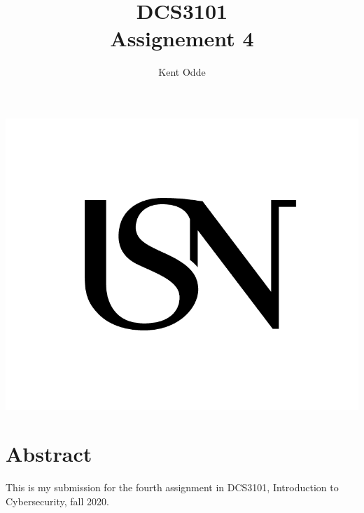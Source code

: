 \documentclass{article}
\begin{document}
\author{Kent Odde}
\title{DCS3101\\Assignement 4}

\maketitle
\thispagestyle{empty}
\begin{center}
\includegraphics[width=\linewidth,height=0.2\textheight,keepaspectratio]{img/USN.png}
\end{center}
\newpage

\tableofcontents

\newpage

\section{Abstract}
This is my submission for the fourth assignment in DCS3101, Introduction to Cybersecurity, fall 2020.
\end{document}
